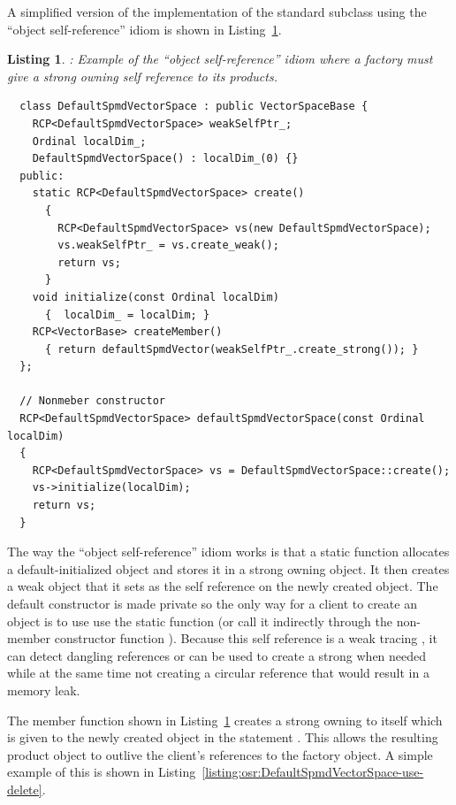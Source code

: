 \documentclass[pdf,ps2pdf,11pt]{SANDreport}
\newtheorem{listing}{Listing}
\begin{document}
A simplified version of the implementation of the
{} standard subclass
{} using the ``object self-reference''
idiom is shown in Listing~\ref{listing:osr:DefaultSpmdVectorSpace}.


\begin{listing}: Example of the ``object self-reference'' idiom where a
factory must give a strong owning {} self reference to its products.  \\
\label{listing:osr:DefaultSpmdVectorSpace}
{\small\begin{verbatim}
  class DefaultSpmdVectorSpace : public VectorSpaceBase {
    RCP<DefaultSpmdVectorSpace> weakSelfPtr_;
    Ordinal localDim_;
    DefaultSpmdVectorSpace() : localDim_(0) {}
  public:
    static RCP<DefaultSpmdVectorSpace> create()
      {
        RCP<DefaultSpmdVectorSpace> vs(new DefaultSpmdVectorSpace);
        vs.weakSelfPtr_ = vs.create_weak();
        return vs;
      }
    void initialize(const Ordinal localDim)
      {  localDim_ = localDim; }
    RCP<VectorBase> createMember()
      { return defaultSpmdVector(weakSelfPtr_.create_strong()); }
  };

  // Nonmeber constructor
  RCP<DefaultSpmdVectorSpace> defaultSpmdVectorSpace(const Ordinal localDim)
  {
    RCP<DefaultSpmdVectorSpace> vs = DefaultSpmdVectorSpace::create();
    vs->initialize(localDim);
    return vs;
  }
\end{verbatim}}
\end{listing}


The way the ``object self-reference'' idiom works is that a static
function {} allocates a default-initialized
{} object and stores it in a strong owning
{} object.  It then creates a weak {} object that it
sets as the self reference on the newly created
{} object.  The default constructor is
made private so the only way for a client to create an
{} object is to use use the static
{} function (or call it indirectly through the
non-member constructor function {}).
Because this self reference is a weak tracing {}, it can
detect dangling references or can be used to create a strong
{} when needed while at the same time not creating a circular
reference that would result in a memory leak.

The member function {} shown in
Listing~\ref{listing:osr:DefaultSpmdVectorSpace} creates a strong
owning {} to itself which is given to the newly created
{} object in the statement
{}.  This
allows the resulting product {} object to
outlive the client's {} references to the
{} factory object.  A simple example of
this is shown in
Listing~\ref{listing:osr:DefaultSpmdVectorSpace-use-delete}.
\end{document}
